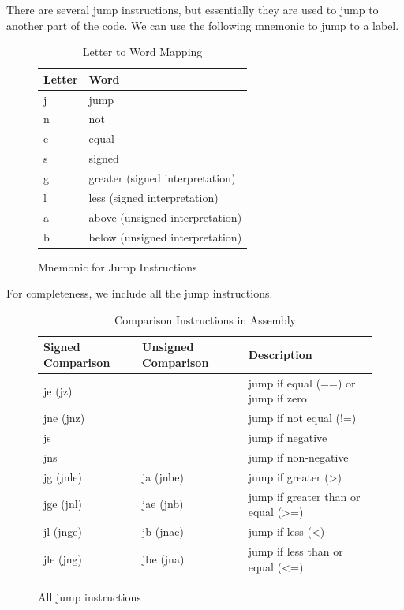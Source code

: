 \documentclass{article}
\begin{document}
  \begin{definition}[Jump]
    There are several jump instructions, but essentially they are used to jump to another part of the code. We can use the following mnemonic to jump to a label. 

    \begin{figure}[H]
      \centering 
      \begin{table}[H]
        \centering
        \begin{tabular}{|l|l|}
        \hline
        \textbf{Letter} & \textbf{Word} \\ \hline
        j & jump \\ \hline
        n & not \\ \hline
        e & equal \\ \hline
        s & signed \\ \hline
        g & greater (signed interpretation) \\ \hline
        l & less (signed interpretation) \\ \hline
        a & above (unsigned interpretation) \\ \hline
        b & below (unsigned interpretation) \\ \hline
        \end{tabular}
        \caption{Letter to Word Mapping}
        \label{table:letter_word_mapping}
      \end{table}
      \caption{Mnemonic for Jump Instructions} 
      \label{fig:jump_instructions_mnemonic}
    \end{figure}

    For completeness, we include all the jump instructions. 
      
    \begin{figure}[H]
      \centering 
      \begin{table}[H]
        \centering
        \begin{tabular}{|l|l|l|}
        \hline
        \textbf{Signed Comparison} & \textbf{Unsigned Comparison} & \textbf{Description} \\ \hline
        je (jz) & & jump if equal (==) or jump if zero \\ \hline
        jne (jnz) & & jump if not equal (!=) \\ \hline
        js & & jump if negative \\ \hline
        jns & & jump if non-negative \\ \hline
        jg (jnle) & ja (jnbe) & jump if greater (>) \\ \hline
        jge (jnl) & jae (jnb) & jump if greater than or equal (>=) \\ \hline
        jl (jnge) & jb (jnae) & jump if less (<) \\ \hline
        jle (jng) & jbe (jna) & jump if less than or equal (<=) \\ \hline
        \end{tabular}
        \caption{Comparison Instructions in Assembly}
        \label{table:comparison_instructions}
      \end{table}
      \caption{All jump instructions} 
      \label{fig:jump_instructions_all}
    \end{figure}
  \end{definition}
\end{document}
